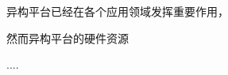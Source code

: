 \begin{cabstract}
异构平台已经在各个应用领域发挥重要作用，

然而异构平台的硬件资源

\end{cabstract}

\begin{eabstract}
....
\end{eabstract}

